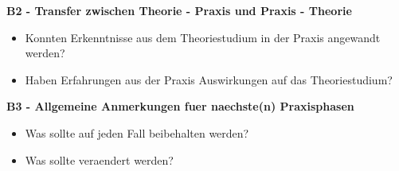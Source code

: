 \textbf{B2 - Transfer zwischen Theorie - Praxis und Praxis - Theorie}

\begin{itemize}
	\item Konnten Erkenntnisse aus dem Theoriestudium in der Praxis angewandt werden?
	\item Haben Erfahrungen aus der Praxis Auswirkungen auf das Theoriestudium?
\end{itemize}

\textbf{B3 - Allgemeine Anmerkungen fuer naechste(n) Praxisphasen}

\begin{itemize}
	\item Was sollte auf jeden Fall beibehalten werden?
	\item Was sollte veraendert werden?
\end{itemize}